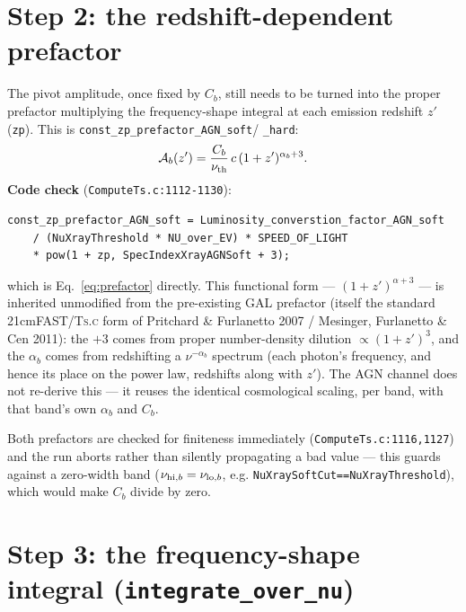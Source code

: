 \documentclass[11pt]{article}
\newcommand{\code}[1]{\texttt{#1}}
\begin{document}
\section{Step 2: the redshift-dependent prefactor}

The pivot amplitude, once fixed by $C_b$, still needs to be turned into the
proper prefactor multiplying the frequency-shape integral at each emission
redshift $z'$ (\code{zp}). This is \code{const\_zp\_prefactor\_AGN\_soft}/
\code{\_hard}:
\begin{equation}
  \mathcal{A}_b(z') = \frac{C_b}{\nu_{\rm th}}\, c\,(1+z')^{\alpha_b + 3}.
  \label{eq:prefactor}
\end{equation}
\textbf{Code check} (\code{ComputeTs.c:1112-1130}):
\begin{verbatim}
const_zp_prefactor_AGN_soft = Luminosity_converstion_factor_AGN_soft
    / (NuXrayThreshold * NU_over_EV) * SPEED_OF_LIGHT
    * pow(1 + zp, SpecIndexXrayAGNSoft + 3);
\end{verbatim}
which is Eq.~\eqref{eq:prefactor} directly. This functional form —
$(1+z')^{\alpha+3}$ — is inherited unmodified from the pre-existing GAL
prefactor (itself the standard 21cmFAST/\textsc{Ts.c} form of Pritchard \&
Furlanetto 2007 / Mesinger, Furlanetto \& Cen 2011): the $+3$ comes from
proper number-density dilution $\propto(1+z')^3$, and the $\alpha_b$ comes
from redshifting a $\nu^{-\alpha_b}$ spectrum (each photon's frequency, and
hence its place on the power law, redshifts along with $z'$). The AGN
channel does not re-derive this — it reuses the identical cosmological
scaling, per band, with that band's own $\alpha_b$ and $C_b$.

Both prefactors are checked for finiteness immediately
(\code{ComputeTs.c:1116,1127}) and the run aborts rather than silently
propagating a bad value — this guards against a zero-width band
($\nu_{{\rm hi},b}=\nu_{{\rm lo},b}$, e.g. \code{NuXraySoftCut==NuXrayThreshold}),
which would make $C_b$ divide by zero.

\section{Step 3: the frequency-shape integral (\code{integrate\_over\_nu})}
\label{sec:shape}
\end{document}
